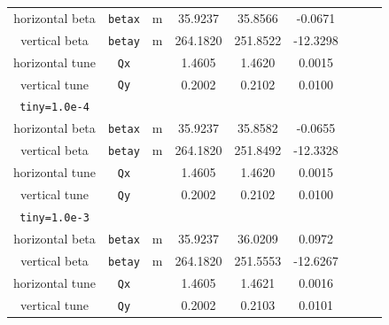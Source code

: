 \documentclass[12pt]{article}
\begin{document}
\begin{table}[h]
\begin{tabular}{|c|c|c|c|c|c|c|c|c|}
horizontal beta  & {\tt betax}        &  m   &    35.9237    &  35.8566      &  -0.0671    \\ 
vertical beta     & {\tt betay}       &  m   &   264.1820    & 251.8522      & -12.3298   \\ 
horizontal tune  &  {\tt Qx}          &      &     1.4605    &   1.4620      &  0.0015 \\ 
vertical tune     &  {\tt Qy}         &      &     0.2002    &   0.2102      &  0.0100 \\ \hline
 {\tt tiny=1.0e-4} &                  &      &               &               &     \\ \hline 
horizontal beta  & {\tt betax}        &  m   &    35.9237    &  35.8582      & -0.0655 \\ 
vertical beta     & {\tt betay}       &  m   &   264.1820    & 251.8492      & -12.3328   \\ 
horizontal tune  &  {\tt Qx}          &      &     1.4605    &   1.4620      &  0.0015\\ 
vertical tune     &  {\tt Qy}         &      &     0.2002    &   0.2102      &  0.0100\\ \hline
 {\tt tiny=1.0e-3} &                  &      &               &               &     \\ \hline 
horizontal beta  & {\tt betax}        &  m   &    35.9237    &   36.0209     & 0.0972 \\ 
vertical beta     & {\tt betay}       &  m   &   264.1820    &  251.5553     & -12.6267 \\ 
horizontal tune  &  {\tt Qx}          &      &     1.4605    &    1.4621     &  0.0016 \\ 
vertical tune     &  {\tt Qy}         &      &     0.2002    &     0.2103    &  0.0101 \\ \hline
\end{tabular}
\end{table}
%
\end{document}
